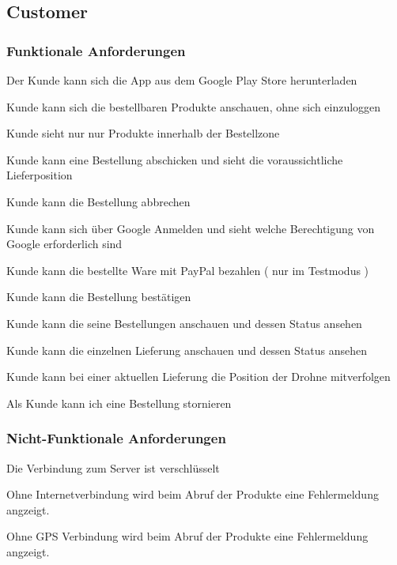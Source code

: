 \subsection{Customer}	
\subsubsection{Funktionale Anforderungen}	
\begin{todolist}
	\item[\xmark] Der Kunde kann sich die App aus dem Google Play Store herunterladen
	\item[\done] Kunde kann sich die bestellbaren Produkte anschauen, ohne sich einzuloggen
	\item[\done] Kunde sieht nur nur Produkte innerhalb der Bestellzone
	\item[\done] Kunde kann eine Bestellung abschicken und sieht die voraussichtliche Lieferposition
	\item[\done] Kunde kann die Bestellung abbrechen
	\item[\done] Kunde kann sich über Google Anmelden und sieht welche Berechtigung von Google erforderlich sind
	\item[\done] Kunde kann die bestellte Ware mit PayPal bezahlen ( nur im Testmodus )
	\item[\done] Kunde kann die Bestellung bestätigen
	\item[\done] Kunde kann die seine Bestellungen anschauen und dessen Status ansehen
	\item[\done] Kunde kann die einzelnen Lieferung anschauen und dessen Status ansehen
	\item[\done] Kunde kann bei einer aktuellen Lieferung die Position der Drohne mitverfolgen
	\item[\xmark] Als Kunde kann ich  eine Bestellung stornieren
\end{todolist}

\subsubsection{Nicht-Funktionale Anforderungen}	
\begin{todolist}
	\item[\done] Die Verbindung zum Server ist verschlüsselt
	\item[\done] Ohne Internetverbindung wird beim Abruf der Produkte eine Fehlermeldung angzeigt.
	\item[\done] Ohne GPS Verbindung wird beim Abruf der Produkte eine Fehlermeldung angzeigt.
\end{todolist}


